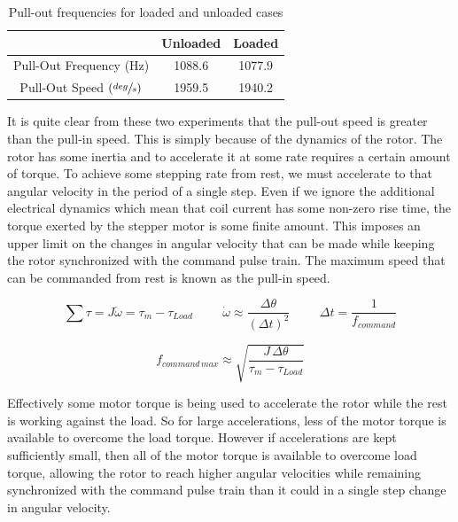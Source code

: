 \documentclass{article}
\theoremstyle{plain}
\theoremstyle{definition}
\theoremstyle{remark}
\begin{document}
\begin{table}[htb]
\begin{center}
    \begin{tabular}{|c|c|c|}
        \hline
        ~                       & Unloaded & Loaded \\ \hline
        Pull-Out Frequency (Hz) & 1088.6   & 1077.9 \\
	Pull-Out Speed $(\sfrac{deg}{s})$ & 1959.5 & 1940.2 \\
        \hline
    \end{tabular}
\caption{Pull-out frequencies for loaded and unloaded cases}
\label{q3b_table2}
\end{center}
\end{table}

It is quite clear from these two experiments that the pull-out speed is greater than the pull-in speed.  This is simply because of the dynamics of the rotor.  The rotor has some inertia and to accelerate it at some rate requires a certain amount of torque.  To achieve some stepping rate from rest, we must accelerate to that angular velocity in the period of a single step.   Even if we ignore the additional electrical dynamics which mean that coil current has some non-zero rise time, the torque exerted by the stepper motor is some finite amount.  This imposes an upper limit on the changes in angular velocity that can be made while keeping the rotor synchronized with the command pulse train.  The maximum speed that can be commanded from rest is known as the pull-in speed.

$$ \sum \tau = J \dot{\omega} = \tau_m - \tau_{Load} \hspace{1cm} \dot{\omega} \approx \frac{\Delta \theta}{(\Delta t)^2} \hspace{1cm} \Delta t = \frac{1}{f_{command}}$$

$$ f_{command \, max} \approx \sqrt{\frac{J \, \Delta \theta}{\tau_{m} - \tau_{Load}}} $$

Effectively some motor torque is being used to accelerate the rotor while the rest is working against the load.  So for large accelerations, less of the motor torque is available to overcome the load torque.  However if accelerations are kept sufficiently small, then all of the motor torque is available to overcome load torque, allowing the rotor to reach higher angular velocities while remaining synchronized with the command pulse train than it could in a single step change in angular velocity.  

\clearpage
\end{document}
